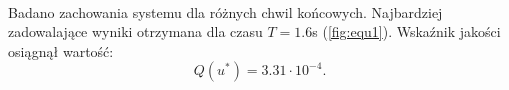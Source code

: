 \paragraph*{}
Badano zachowania systemu dla różnych chwil końcowych. Najbardziej zadowalające wyniki otrzymana dla czasu \(T=1.6\)s (\ref{fig:equ1}). Wskaźnik jakości osiągnął wartość:
\begin{equation}
Q(u^*)=3.31\cdot10^{-4}.
\end{equation}

\begin{figure}[H]
	\centering
	~~
	
	~~
	

\end{figure}
